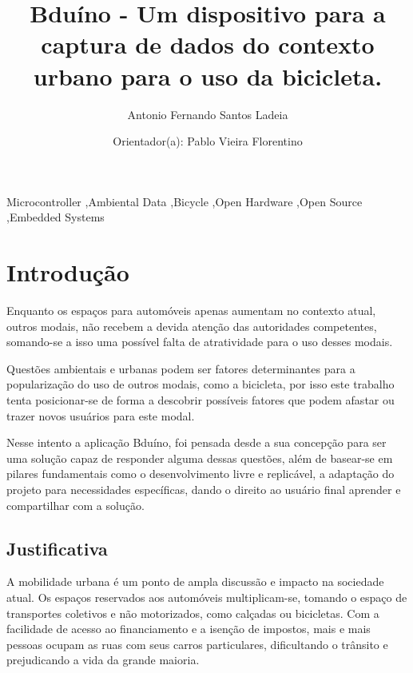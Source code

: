 \documentclass[final,12pt, times, 5p, twocolumn]{elsarticle}
\begin{document}
\begin{frontmatter}

\title{Bduíno - Um dispositivo para a captura de dados do contexto urbano para o uso da bicicleta.}

\author[ant]{Antonio Fernando Santos Ladeia}
\author[pab] {Orientador(a): Pablo Vieira Florentino}

\address[ant]{Instituto Federal da Bahia}
\address[pab]{Instituto Federal da Bahia}

\begin{abstract}

\end{abstract}

\begin{keyword}
Microcontroller \sep Ambiental Data \sep Bicycle \sep Open Hardware \sep Open Source \sep Embedded Systems
\end{keyword}

\end{frontmatter}

\section{Introdução}

Enquanto os espaços para automóveis apenas aumentam no contexto atual, outros modais, não recebem a devida atenção das autoridades competentes, somando-se a isso uma possível falta de atratividade para o uso desses modais.

Questões ambientais e urbanas podem ser fatores determinantes para a popularização do uso de outros modais, como a bicicleta, por isso este trabalho tenta posicionar-se de forma a descobrir possíveis fatores que podem afastar ou trazer novos usuários para este modal.

Nesse intento a aplicação Bduíno, foi pensada desde a sua concepção para ser uma solução capaz de responder alguma dessas questões, além de basear-se em pilares fundamentais como o desenvolvimento livre e replicável, a adaptação do projeto para necessidades específicas, dando o direito ao usuário final aprender e compartilhar com a solução. 

\subsection{Justificativa}

A mobilidade urbana é um ponto de ampla discussão e impacto na sociedade atual. Os espaços reservados aos automóveis multiplicam-se, tomando o espaço de transportes coletivos e não motorizados, como calçadas ou bicicletas. Com a facilidade de acesso ao financiamento e a isenção de impostos, mais e mais pessoas ocupam as ruas com seus carros particulares,  dificultando o trânsito  e prejudicando a vida da grande maioria.
\end{document}
